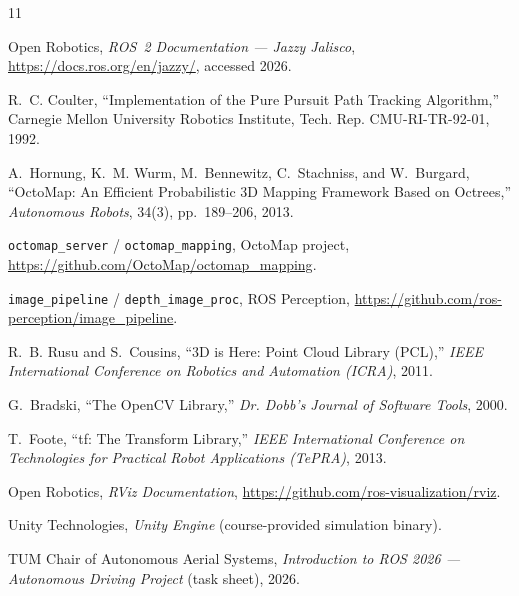 \documentclass[10pt,twocolumn]{article}
\begin{document}
\footnotesize
\begin{thebibliography}{11}
\setlength{\itemsep}{1pt}
\setlength{\parskip}{0pt}

 Open Robotics, \emph{ROS~2 Documentation --- Jazzy Jalisco}, \url{https://docs.ros.org/en/jazzy/}, accessed 2026.

 R.~C. Coulter, ``Implementation of the Pure Pursuit Path Tracking Algorithm,'' Carnegie Mellon University Robotics Institute, Tech. Rep. CMU-RI-TR-92-01, 1992.

 A.~Hornung, K.~M. Wurm, M.~Bennewitz, C.~Stachniss, and W.~Burgard, ``OctoMap: An Efficient Probabilistic 3D Mapping Framework Based on Octrees,'' \emph{Autonomous Robots}, 34(3), pp.~189--206, 2013.

 \texttt{octomap\_server} / \texttt{octomap\_mapping}, OctoMap project, \url{https://github.com/OctoMap/octomap_mapping}.

 \texttt{image\_pipeline} / \texttt{depth\_image\_proc}, ROS Perception, \url{https://github.com/ros-perception/image_pipeline}.

 R.~B. Rusu and S.~Cousins, ``3D is Here: Point Cloud Library (PCL),'' \emph{IEEE International Conference on Robotics and Automation (ICRA)}, 2011.

 G.~Bradski, ``The OpenCV Library,'' \emph{Dr. Dobb's Journal of Software Tools}, 2000.

 T.~Foote, ``tf: The Transform Library,'' \emph{IEEE International Conference on Technologies for Practical Robot Applications (TePRA)}, 2013.

 Open Robotics, \emph{RViz Documentation}, \url{https://github.com/ros-visualization/rviz}.

 Unity Technologies, \emph{Unity Engine} (course-provided simulation binary).

 TUM Chair of Autonomous Aerial Systems, \emph{Introduction to ROS 2026 --- Autonomous Driving Project} (task sheet), 2026.

\end{thebibliography}

\balance
\end{document}
